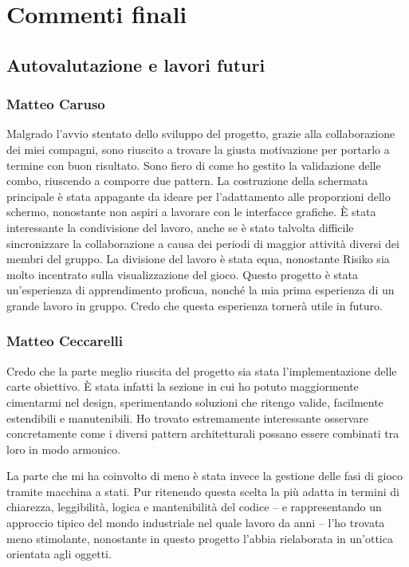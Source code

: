 \documentclass[a4paper,12pt]{report}
\begin{document}
\chapter{Commenti finali}

\section{Autovalutazione e lavori futuri}
\subsection{Matteo Caruso}
Malgrado l'avvio stentato dello sviluppo del progetto, grazie alla collaborazione dei miei compagni, sono riuscito a trovare la giusta motivazione per portarlo a termine con buon risultato.
Sono fiero di come ho gestito la validazione delle combo, riuscendo a comporre due pattern.
La costruzione della schermata principale è stata appagante da ideare per l'adattamento alle proporzioni dello schermo, nonostante non aspiri a lavorare con le interfacce grafiche.
È stata interessante la condivisione del lavoro, anche se è stato talvolta difficile sincronizzare la collaborazione a causa dei periodi di maggior attività diversi dei membri del gruppo.
La divisione del lavoro è stata equa, nonostante Risiko sia molto incentrato sulla visualizzazione del gioco.
Questo progetto è stata un'esperienza di apprendimento proficua, nonché la mia prima esperienza di un grande lavoro in gruppo. Credo che questa esperienza tornerà utile in futuro.
\subsection{Matteo Ceccarelli}
Credo che la parte meglio riuscita del progetto sia stata l'implementazione delle carte obiettivo.
È stata infatti la sezione in cui ho potuto maggiormente cimentarmi nel design, sperimentando soluzioni che ritengo valide, facilmente estendibili e manutenibili.
Ho trovato estremamente interessante osservare concretamente come i diversi pattern architetturali possano essere combinati tra loro in modo armonico.

La parte che mi ha coinvolto di meno è stata invece la gestione delle fasi di gioco tramite macchina a stati.
Pur ritenendo questa scelta la più adatta in termini di chiarezza, leggibilità, logica e mantenibilità del codice
-- e rappresentando un approccio tipico del mondo industriale nel quale lavoro da anni --
l'ho trovata meno stimolante, nonostante in questo progetto l'abbia rielaborata in un'ottica orientata agli oggetti.
\end{document}
